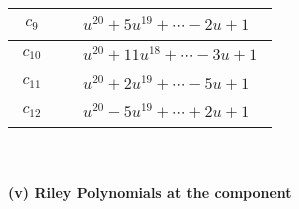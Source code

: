 \documentclass[1p]{elsarticle_modified}
\theoremstyle{definition}
\begin{document}
\begin{tabular}{m{50pt}|m{274pt}}
\hline $$\begin{aligned}c_{9}\end{aligned}$$&$\begin{aligned}
&u^{20}+5 u^{19}+\cdots-2 u+1
\end{aligned}$\\
\hline $$\begin{aligned}c_{10}\end{aligned}$$&$\begin{aligned}
&u^{20}+11 u^{18}+\cdots-3 u+1
\end{aligned}$\\
\hline $$\begin{aligned}c_{11}\end{aligned}$$&$\begin{aligned}
&u^{20}+2 u^{19}+\cdots-5 u+1
\end{aligned}$\\
\hline $$\begin{aligned}c_{12}\end{aligned}$$&$\begin{aligned}
&u^{20}-5 u^{19}+\cdots+2 u+1
\end{aligned}$\\
\hline
\end{tabular}\\~\\
\newpage\renewcommand{\arraystretch}{1}
\flushleft \textbf{(v) Riley Polynomials at the component}\newline \\
\end{document}
